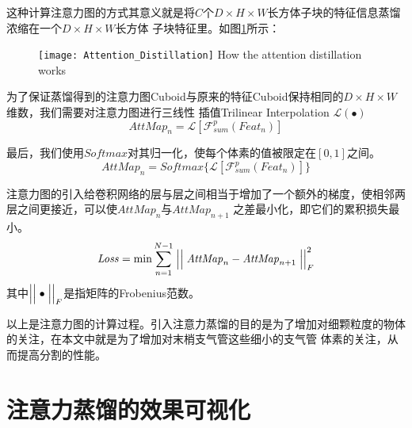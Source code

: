 这种计算注意力图的方式其意义就是将$C$个$D \times H \times W$长方体子块的特征信息蒸馏浓缩在一个$D \times H \times W$长方体
子块特征里。如图\ref{fig:attention_distillation}所示：
\begin{figure}[!htp]
    \centering
    \texttt{[image: Attention\_Distillation]}
        {How the attention distillation works}
    \label{fig:attention_distillation}
\end{figure}

为了保证蒸馏得到的注意力图Cuboid与原来的特征Cuboid保持相同的$D \times H \times W$维数，我们需要对注意力图进行三线性
插值Trilinear Interpolation $\mathcal{L}(\bullet)$
\begin{equation}
    \mathit{AttMap}_{n} = \mathcal{L}\left[\mathcal{F}_{sum}^{p}\left(\mathit{Feat}_{n}\right)\right]
\end{equation}

最后，我们使用$Softmax$对其归一化，使每个体素的值被限定在$[0, 1]$之间。
\begin{equation}
    \mathit{AttMap}_{n} = \mathit{Softmax}\{ \mathcal{L}\left[\mathcal{F}_{sum}^{p}\left(\mathit{Feat}_{n}\right)\right] \}
\end{equation}

注意力图的引入给卷积网络的层与层之间相当于增加了一个额外的梯度，使相邻两层之间更接近，可以使$\mathit{AttMap}_{n}$与$\mathit{AttMap}_{n+1}$
之差最小化，即它们的累积损失最小。
\begin{equation}\label{eq:attention_distillation_loss}
    \mathit{Loss} = \min \sum_{n=1}^{N-1} \Bigm|\Bigm|\mathit{AttMap}_{n} - \mathit{AttMap}_{n+1} \Bigm|\Bigm|_{F}^{2}
\end{equation}
其中$\Bigm|\Bigm|\bullet\Bigm|\Bigm|_{F}$是指矩阵的Frobenius范数。

以上是注意力图的计算过程。引入注意力蒸馏的目的是为了增加对细颗粒度的物体的关注，在本文中就是为了增加对末梢支气管这些细小的支气管
体素的关注，从而提高分割的性能。

\section{注意力蒸馏的效果可视化}

